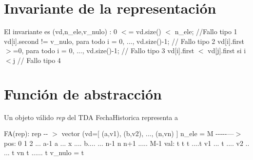 \hypertarget{repConjunto_invConjunto}{}\section{Invariante de la representación}\label{repConjunto_invConjunto}
El invariante es {\itshape }(vd,n\+\_\+ele,v\+\_\+nulo) \+: 0 $<$= vd.\+size() $<$ n\+\_\+ele; //\+Fallo tipo 1 vd\mbox{[}i\mbox{]}.second != v\+\_\+nulo, para todo i = 0, ..., vd.\+size()-\/1; // Fallo tipo 2 vd\mbox{[}i\mbox{]}.first $>$=0, para todo i = 0, ..., vd.\+size()-\/1; // Fallo tipo 3 vd\mbox{[}i\mbox{]}.first $<$ vd\mbox{[}j\mbox{]}.first si i$<$j // Fallo tipo 4\hypertarget{repConjunto_faConjunto}{}\section{Función de abstracción}\label{repConjunto_faConjunto}
Un objeto válido {\itshape rep} del T\+DA Fecha\+Historica representa a

F\+A(rep)\+: rep -\/-\/ $>$ vector (vd=\mbox{[} (a,v1), (b,v2), ..., (n,vn) \mbox{]} n\+\_\+ele = M -\/-\/-\/-\/-\/---$>$ pos\+: 0 1 2 ... a-\/1 a ... x .... b.... ... n-\/1 n n+1 ..... M-\/1 val\+: t t t ....t v1 ... t .... v2 .. ... t vn t ...... t v\+\_\+nulo = t 
